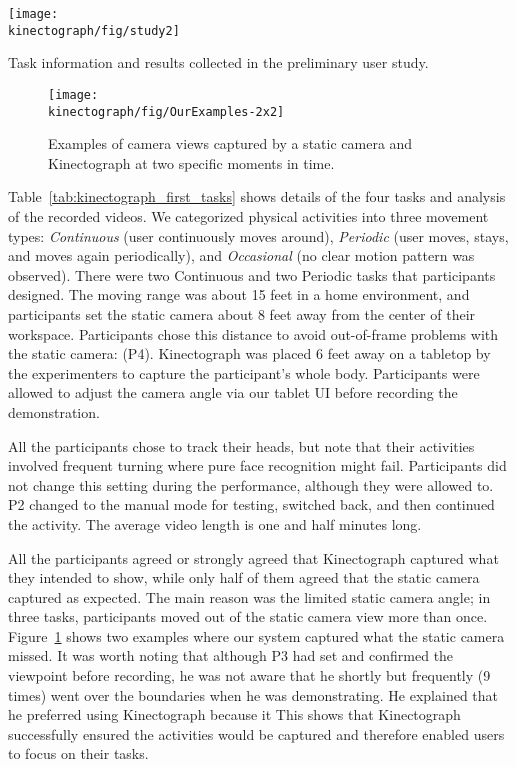 \begin{table}[b!]
     \centering
    \texttt{[image: \\kinectograph/fig/study2]}
    \caption{Task information and results collected in the preliminary user study.}
    \label{tab:kinectograph_first_tasks}
 \end{table}

\begin{figure}[t!]
     \centering
    \texttt{[image: \\kinectograph/fig/OurExamples-2x2]}
    \caption{Examples of camera views captured by a static camera and Kinectograph at two specific moments in time.}
    \label{fig:kinectograph_dance}
\end{figure}

Table~\ref{tab:kinectograph_first_tasks} shows details of the four tasks and analysis of the recorded videos. We categorized physical activities into three movement types: \emph{Continuous} (user continuously moves around), \emph{Periodic} (user moves, stays, and moves again periodically), and \emph{Occasional} (no clear motion pattern was observed).
%
There were two Continuous and two Periodic tasks that participants designed. The moving range was about 15 feet in a home environment, and participants set the static camera about 8 feet away from the center of their workspace. Participants chose this distance to avoid out-of-frame problems with the static camera:  (P4). Kinectograph was placed 6 feet away on a tabletop by the experimenters to capture the participant's whole body. Participants were allowed to adjust the camera angle via our tablet UI before recording the demonstration.

All the participants chose to track their heads, but note
that their activities involved frequent turning where
pure face recognition might fail. Participants did not
change this setting during the performance, although
they were allowed to. P2 changed to the manual mode
for testing, switched back, and then continued the
activity. The average video length is one and half
minutes long.

All the participants agreed or strongly agreed that
Kinectograph captured what they intended to show,
while only half of them agreed that the static camera
captured as expected. The main reason was the
limited static camera angle; in three tasks, participants
moved out of the static camera view more than once. Figure~\ref{fig:kinectograph_dance} shows two examples where our system
captured what the static camera missed. It was worth
noting that although P3 had set and confirmed the
viewpoint before recording, he was not aware that he
shortly but frequently (9 times) went over the
boundaries when he was demonstrating. He explained
that he preferred using Kinectograph because it  This shows that Kinectograph successfully
ensured the activities would be captured and therefore
enabled users to focus on their tasks.

